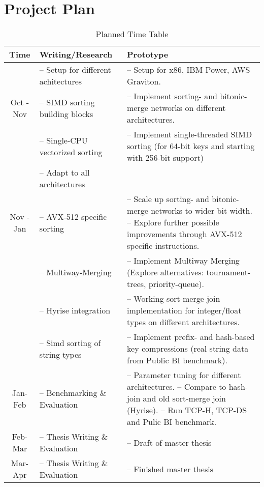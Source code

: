 \newpage
\section{Project Plan}
\label{sec:plan}


\begin{table}[h!]
    \centering
    \begin{tabular}{ | c | m{} | m{} | }
        \hline
        \textbf{Time} & \textbf{Writing/Research} & \textbf{Prototype} \\
        \hline
                      & -- Setup for different achitectures &  -- Setup for x86, IBM Power, AWS Graviton. \\
        Oct - Nov  & -- SIMD sorting building blocks & -- Implement sorting- and bitonic-merge networks on different architectures.\\ 
                   & -- Single-CPU vectorized sorting & -- Implement single-threaded SIMD sorting (for 64-bit keys and starting with 256-bit support) \\ 
                   & -- Adapt to all architectures \\
        \hline
        Nov - Jan & -- AVX-512 specific sorting & -- Scale up sorting- and bitonic-merge networks to wider bit width. \newline -- Explore further possible improvements through AVX-512 specific instructions. \\
                  & -- Multiway-Merging & -- Implement Multiway Merging (Explore alternatives: tournament-trees, priority-queue). \\    
                  & -- Hyrise integration & -- Working sort-merge-join implementation for integer/float types on different architectures.\\ 
                  & -- Simd sorting of string types & -- Implement prefix- and hash-based key compressions (real string data from Public BI benchmark).\\ 
        \hline
        Jan-Feb & -- Benchmarking \& Evaluation & -- Parameter tuning for different architectures. \newline 
                                                   -- Compare to hash-join and old sort-merge join (Hyrise). \newline
                                                   -- Run TCP-H, TCP-DS and Pulic BI benchmark. \\
        \hline
        Feb-Mar & -- Thesis Writing \& Evaluation & -- Draft of master thesis\\
        \hline
        Mar-Apr & -- Thesis Writing \& Evaluation & -- Finished master thesis \\
       \hline 
    \end{tabular}
    \caption{Planned Time Table}
    \label{tab:time-table}
\end{table}
